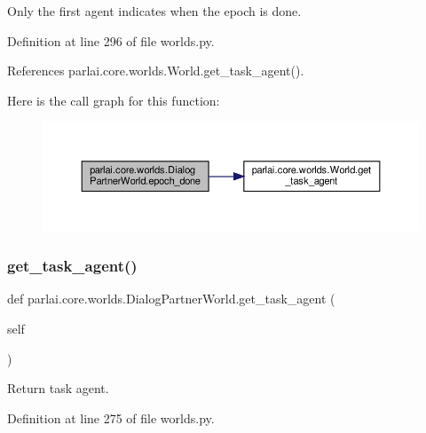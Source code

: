 \begin{DoxyVerb}Only the first agent indicates when the epoch is done.\end{DoxyVerb}
 

Definition at line 296 of file worlds.\+py.



References parlai.\+core.\+worlds.\+World.\+get\+\_\+task\+\_\+agent().

Here is the call graph for this function\+:
\nopagebreak
\begin{figure}[H]
\begin{center}
\leavevmode
\includegraphics[width=350pt]{classparlai_1_1core_1_1worlds_1_1DialogPartnerWorld_a4cb1a886df2adc8e469d45652264da36_cgraph}
\end{center}
\end{figure}
\mbox{\label{classparlai_1_1core_1_1worlds_1_1DialogPartnerWorld_ac3a0c82c725967468208ec10022b6abe}} 
\subsubsection{\texorpdfstring{get\+\_\+task\+\_\+agent()}{get\_task\_agent()}}
{\footnotesize\ttfamily def parlai.\+core.\+worlds.\+Dialog\+Partner\+World.\+get\+\_\+task\+\_\+agent (\begin{DoxyParamCaption}\item[{}]{self }\end{DoxyParamCaption})}

\begin{DoxyVerb}Return task agent.\end{DoxyVerb}
 

Definition at line 275 of file worlds.\+py.



